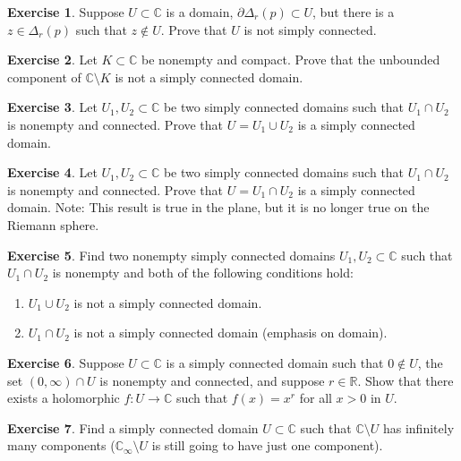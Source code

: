 \documentclass[12pt,openany]{book}
\newcommand{\C}{{\mathbb{C}}}
\newcommand{\R}{{\mathbb{R}}}
\theoremstyle{plain}
\theoremstyle{remark}
\theoremstyle{definition}
\newenvironment{exbox}{%
    \def\FrameCommand{\vrule width 1pt \relax\hspace{10pt}}%
    \MakeFramed{\advance\hsize-\width\FrameRestore}%
}{%
    \endMakeFramed
}
\newenvironment{exnumparts}{%
    \leavevmode\begin{enumerate}[1),noitemsep,topsep=0pt,parsep=0pt,partopsep=0pt]
}{%
    \end{enumerate}
}
\theoremstyle{exercise}
\newtheorem{exercise}{Exercise}[section]
\theoremstyle{example}
\begin{document}
\begin{exbox}
\begin{exercise}
Suppose $U \subset \C$ is a domain, $\partial \Delta_r(p) \subset U$,
but there is a $z \in \Delta_r(p)$ such that $z \notin U$.
Prove that $U$ is not simply connected.
\end{exercise}

\begin{exercise}
Let $K \subset \C$ be nonempty and compact.
Prove that the unbounded component of $\C \setminus K$ is not a
simply connected domain.
\end{exercise}

\begin{exercise}
Let $U_1,U_2 \subset \C$ be two simply connected domains such that $U_1 \cap
U_2$ is nonempty and connected.
Prove that $U = U_1 \cup U_2$ is a simply connected domain.
\end{exercise}

\begin{exercise}
Let $U_1,U_2 \subset \C$ be two simply connected domains such that $U_1 \cap
U_2$ is nonempty and connected.
Prove that $U = U_1 \cap U_2$ is a simply connected domain.
Note: This result is true in the plane, but it is no longer true on the Riemann
sphere.
\end{exercise}

\begin{exercise}
Find two nonempty simply connected domains
$U_1,U_2 \subset \C$ such that $U_1 \cap U_2$ is nonempty and both
of the following conditions hold:
\begin{exnumparts}
\item
$U_1 \cup U_2$ is not a simply connected domain.
\item
$U_1 \cap U_2$ is not a simply connected domain (emphasis on domain).
\end{exnumparts}
\end{exercise}

\begin{exercise}
Suppose $U \subset \C$ is a simply connected domain such that $0 \notin U$,
the set $(0,\infty) \cap U$ is nonempty and connected, and suppose $r \in \R$.
Show that there exists a holomorphic $f \colon U \to \C$ such
that $f(x) = x^r$ for all $x > 0$ in $U$.
\end{exercise}

\begin{exercise}
Find a simply connected domain $U \subset \C$ such that $\C \setminus U$
has infinitely many components ($\C_\infty \setminus U$ is still going to
have just one component).
\end{exercise}
\end{exbox}
\end{document}
